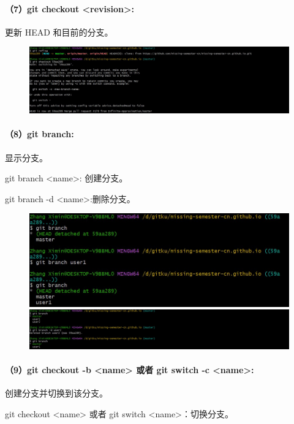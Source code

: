 \documentclass[a4paper, 12pt]{article}
\begin{document}
	\paragraph{（7）git checkout <revision>:}
	更新 HEAD 和目前的分支。	
	
	\begin{figure}[H]
		\centering
		\includegraphics[width=1\textwidth]{022.jpg}
	\end{figure}
	
	\paragraph{（8）git branch:}	
	显示分支。
	
	git branch <name>: 创建分支。
	
	git branch -d <name>:删除分支。
	
	\begin{figure}[H]
		\centering
		\includegraphics[width=1\textwidth]{023.jpg}
		\includegraphics[width=1\textwidth]{026.jpg}
	\end{figure}
	
	\paragraph{（9）git checkout -b <name> 或者 git switch -c <name>:}	
	创建分支并切换到该分支。
	
	git checkout <name> 或者 git switch <name>：切换分支。
	
\end{document}
